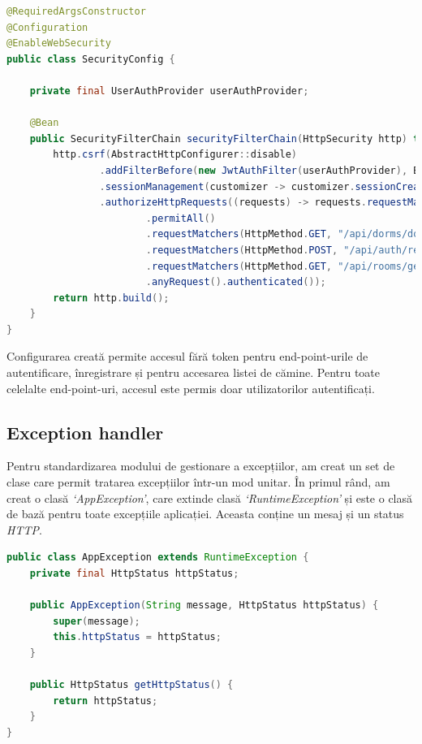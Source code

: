 \documentclass[12pt,a4paper]{report}
\theoremstyle{definition}
\theoremstyle{remark}
\begin{document}
\begin{lstlisting}[language=Java, caption={Clasa prin care se realizează configurarea Spring Security}]
@RequiredArgsConstructor
@Configuration
@EnableWebSecurity
public class SecurityConfig {

    private final UserAuthProvider userAuthProvider;

    @Bean
    public SecurityFilterChain securityFilterChain(HttpSecurity http) throws Exception {
        http.csrf(AbstractHttpConfigurer::disable)
                .addFilterBefore(new JwtAuthFilter(userAuthProvider), BasicAuthenticationFilter.class)
                .sessionManagement(customizer -> customizer.sessionCreationPolicy(SessionCreationPolicy.STATELESS))
                .authorizeHttpRequests((requests) -> requests.requestMatchers(HttpMethod.POST, "/api/auth/login")
                        .permitAll()
                        .requestMatchers(HttpMethod.GET, "/api/dorms/dorms-names").permitAll()
                        .requestMatchers(HttpMethod.POST, "/api/auth/register-student").permitAll()
                        .requestMatchers(HttpMethod.GET, "/api/rooms/get-rooms-numbers-from-dorm/**").permitAll()
                        .anyRequest().authenticated());
        return http.build();
    }
}
\end{lstlisting}

\par Configurarea creată permite accesul fără token pentru end-point-urile de autentificare, înregistrare și pentru accesarea listei de cămine. Pentru toate celelalte end-point-uri, accesul este permis doar utilizatorilor autentificați.
\subsection{Exception handler}\label{sec:exception-handler}

\par Pentru standardizarea modului de gestionare a excepțiilor, am creat un set de clase care permit tratarea excepțiilor într-un mod unitar. În primul rând, am creat o clasă \textit{`AppException'}, care extinde clasă \textit{`RuntimeException'} și este o clasă de bază pentru toate excepțiile aplicației. Aceasta conține un mesaj și un status \textit{HTTP}.

\begin{lstlisting}[language=Java, caption={Clasa de bază pentru excepții}]
public class AppException extends RuntimeException {
    private final HttpStatus httpStatus;

    public AppException(String message, HttpStatus httpStatus) {
        super(message);
        this.httpStatus = httpStatus;
    }

    public HttpStatus getHttpStatus() {
        return httpStatus;
    }
}
\end{lstlisting}
\end{document}
